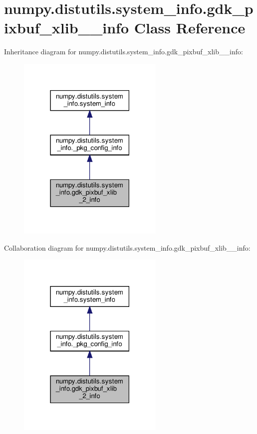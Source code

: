 \hypertarget{classnumpy_1_1distutils_1_1system__info_1_1gdk__pixbuf__xlib__2__info}{}\section{numpy.\+distutils.\+system\+\_\+info.\+gdk\+\_\+pixbuf\+\_\+xlib\+\_\+\_\+info Class Reference}
\label{classnumpy_1_1distutils_1_1system__info_1_1gdk__pixbuf__xlib__2__info}


Inheritance diagram for numpy.\+distutils.\+system\+\_\+info.\+gdk\+\_\+pixbuf\+\_\+xlib\+\_\+\_\+info\+:
\nopagebreak
\begin{figure}[H]
\begin{center}
\leavevmode
\includegraphics[width=198pt]{classnumpy_1_1distutils_1_1system__info_1_1gdk__pixbuf__xlib__2__info__inherit__graph}
\end{center}
\end{figure}


Collaboration diagram for numpy.\+distutils.\+system\+\_\+info.\+gdk\+\_\+pixbuf\+\_\+xlib\+\_\+\_\+info\+:
\nopagebreak
\begin{figure}[H]
\begin{center}
\leavevmode
\includegraphics[width=198pt]{classnumpy_1_1distutils_1_1system__info_1_1gdk__pixbuf__xlib__2__info__coll__graph}
\end{center}
\end{figure}
